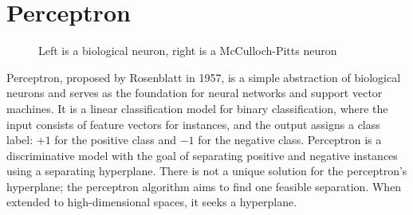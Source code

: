 \documentclass[10pt,twocolumn,letterpaper]{article}
\begin{document}
\section{Perceptron}
\label{sec:perceptron}
\begin{figure}[t]
	\centering
	\caption{Left is a biological neuron, right is a McCulloch-Pitts neuron}
	\label{fig:short}
\end{figure}
Perceptron, proposed by Rosenblatt in 1957, is a simple abstraction of biological neurons and serves as the foundation for neural networks and support vector machines. It is a linear classification model for binary classification, where the input consists of feature vectors for instances, and the output assigns a class label: $+1$ for the positive class and $-1$ for the negative class\cite{rosenblatt1958perceptron}. Perceptron is a discriminative model with the goal of separating positive and negative instances using a separating hyperplane. There is not a unique solution for the perceptron's hyperplane; the perceptron algorithm aims to find one feasible separation. When extended to high-dimensional spaces, it seeks a hyperplane.
\end{document}
